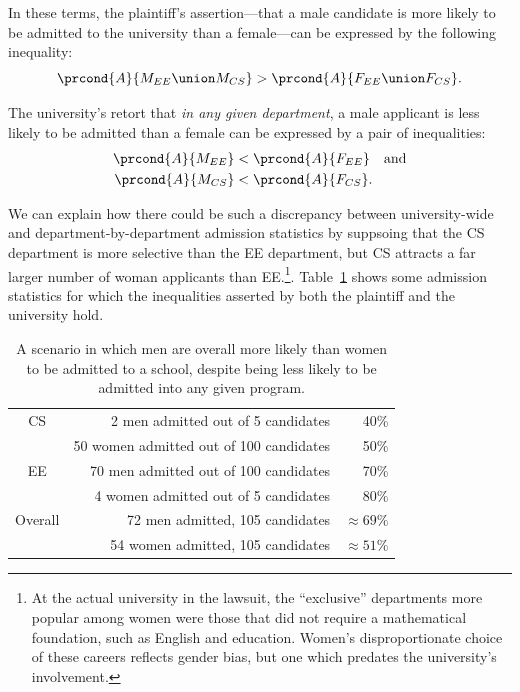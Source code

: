 In these terms, the plaintiff's assertion---that a male candidate is
more likely to be admitted to the university than a female---can be
expressed by the following inequality:
\[
    \prcond{A}{M_{EE} \union M_{CS}} > \prcond{A}{F_{EE} \union F_{CS}}.
\]

The university's retort that \emph{in any given department}, a male
applicant is less likely to be admitted than a female can be expressed
by a pair of inequalities:
\begin{align*}
\prcond{A}{M_{EE}} & < \prcond{A}{F_{EE}} \quad\text{and}\\
\prcond{A}{M_{CS}} & < \prcond{A}{F_{CS}}.
\end{align*}

We can explain how there could be such a discrepancy between
university-wide and department-by-department admission statistics by
suppsoing that the CS department is more selective than the EE
department, but CS attracts a far larger number of woman applicants
than EE.\footnote{At the actual university in the lawsuit, the
  ``exclusive'' departments more popular among women were those that
  did not require a mathematical foundation, such as English and
  education.  Women's disproportionate choice of these careers
  reflects gender bias, but one which predates the university's
  involvement.}.  Table~\ref{fig:15D3} shows some admission statistics
for which the inequalities asserted by both the plaintiff and the
university hold.

\begin{table}

\begin{tabular}{crr}
CS & 2 men admitted out of 5 candidates      &   40\% \\
   & 50 women admitted out of 100 candidates     &  50\% \\
EE & 70 men admitted out of 100 candidates   &  70\% \\
   & 4 women admitted out of 5 candidates         & 80\% \\
\hline
Overall & 72 men admitted, 105 candidates & $\approx 69\%$ \\
        & 54 women admitted, 105 candidates   & $\approx 51\%$
\end{tabular}

\caption{A scenario in which men are overall more likely than women to
  be admitted to a school, despite being less likely to be admitted
  into any given program.}

\label{fig:15D3}

\end{table}

